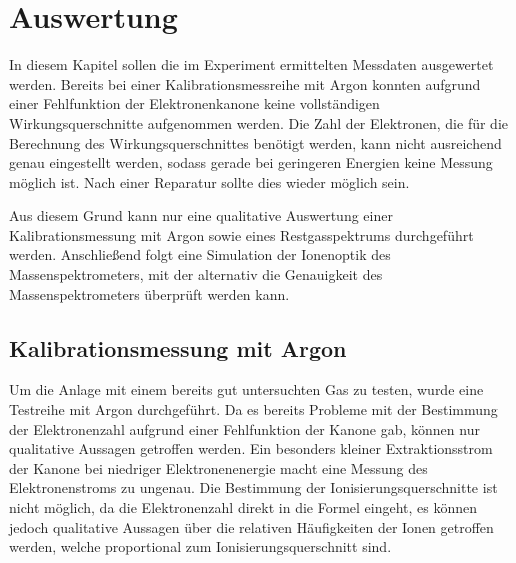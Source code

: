 \chapter{Auswertung}
\label{chap:Auswertung}
In diesem Kapitel sollen die im Experiment ermittelten Messdaten ausgewertet werden. Bereits bei einer Kalibrationsmessreihe mit Argon konnten aufgrund einer Fehlfunktion der Elektronenkanone keine vollständigen Wirkungsquerschnitte aufgenommen werden. Die Zahl der Elektronen, die für die Berechnung des Wirkungsquerschnittes benötigt werden, kann nicht ausreichend genau eingestellt werden, sodass gerade bei geringeren Energien keine Messung möglich ist. Nach einer Reparatur sollte dies wieder möglich sein. 

Aus diesem Grund kann nur eine qualitative Auswertung einer Kalibrationsmessung mit Argon sowie eines Restgasspektrums durchgeführt werden. Anschließend folgt eine Simulation der Ionenoptik des Massenspektrometers, mit der alternativ die Genauigkeit des Massenspektrometers überprüft werden kann.

\section{Kalibrationsmessung mit Argon}
Um die Anlage mit einem bereits gut untersuchten Gas zu testen, wurde eine Testreihe mit Argon durchgeführt. Da es bereits Probleme mit der Bestimmung der Elektronenzahl aufgrund einer Fehlfunktion der Kanone gab, können nur qualitative Aussagen getroffen werden. Ein besonders kleiner Extraktionsstrom der Kanone bei niedriger Elektronenenergie macht eine Messung des Elektronenstroms zu ungenau. Die Bestimmung der Ionisierungsquerschnitte ist nicht möglich, da die Elektronenzahl direkt in die Formel eingeht, es können jedoch qualitative Aussagen über die relativen Häufigkeiten der Ionen getroffen werden, welche proportional zum Ionisierungsquerschnitt sind.

